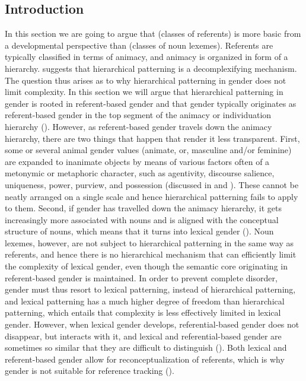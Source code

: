 \documentclass[output=collectionpaper]{langsci/langscibook}
\begin{document}
  \subsection{Introduction}
\label{sec:WDG:3.1}
In this section we are going to argue that  (classes of referents) is more basic from a developmental perspective than  (classes of noun lexemes). Referents are typically classified in terms of animacy, and animacy is organized in form of a hierarchy.  suggests that hierarchical patterning is a decomplexifying mechanism. The question thus arises as to why hierarchical patterning in gender does not limit complexity. In this section we will argue that hierarchical patterning in gender is rooted in referent-based gender and that gender typically originates as referent-based gender in the top segment of the animacy or individuation hierarchy (). However, as referent-based gender travels down the animacy hierarchy, there are two things that happen that render it less transparent. First, some or several animal gender values (animate, or, masculine and/or feminine) are expanded to inanimate objects by means of various factors often of a metonymic or metaphoric character, such as agentivity, discourse salience, uniqueness, power, purview, and possession (discussed in  and ). These cannot be neatly arranged on a single scale and hence hierarchical patterning fails to apply to them. Second, if gender has travelled down the animacy hierarchy, it gets increasingly more associated with nouns and is aligned with the conceptual structure of nouns, which means that it turns into lexical gender (). Noun lexemes, however, are not subject to hierarchical patterning in the same way as referents, and hence there is no hierarchical mechanism that can efficiently limit the complexity of lexical gender, even though the semantic core originating in referent-based gender is maintained. In order to prevent complete disorder, gender must thus resort to lexical patterning, instead of hierarchical patterning, and lexical patterning has a much higher degree of freedom than hierarchical patterning, which entails that complexity is less effectively limited in lexical gender. However, when lexical gender develops, referential-based gender does not disappear, but interacts with it, and lexical and referential-based gender are sometimes so similar that they are difficult to distinguish (). Both lexical and referent-based gender allow for reconceptualization of referents, which is why gender is not suitable for reference tracking ().
\end{document}
